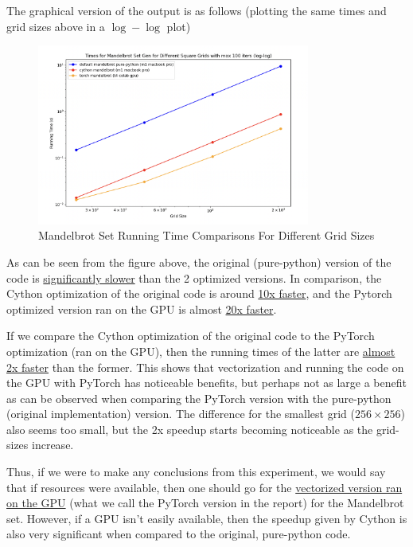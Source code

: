 \documentclass[a4paper,12pt]{article}
\begin{document}
The graphical version of the output is as follows (plotting the same times and grid sizes above in a $\log - \log$ plot)
\begin{figure}[H]
  \centering
  \includegraphics[width=0.8\textwidth]{images/bonus_comparison.png}
  \caption{Mandelbrot Set Running Time Comparisons For Different Grid Sizes}
\end{figure}

As can be seen from the figure above, the original (pure-python) version of the code is \underline{significantly slower} than the 2 optimized versions. In comparison, the Cython optimization of the original code is around \underline{10x faster}, and the Pytorch optimized version ran on the GPU is almost \underline{20x faster}. 

If we compare the Cython optimization of the original code to the PyTorch optimization (ran on the GPU), then the running times of the latter are \underline{almost 2x faster} than the former. This shows that vectorization and running the code on the GPU with PyTorch has noticeable benefits, but perhaps not as large a benefit as can be observed when comparing the PyTorch version with the pure-python (original implementation) version. The difference for the smallest grid ($256 \times 256$) also seems too small, but the 2x speedup starts becoming noticeable as the grid-sizes increase. 

Thus, if we were to make any conclusions from this experiment, we would say that if resources were available, then one should go for the \underline{vectorized version ran on the GPU} (what we call the PyTorch version in the report) for the Mandelbrot set. However, if a GPU isn't easily available, then the speedup given by Cython is also very significant when compared to the original, pure-python code. 



\end{document}
